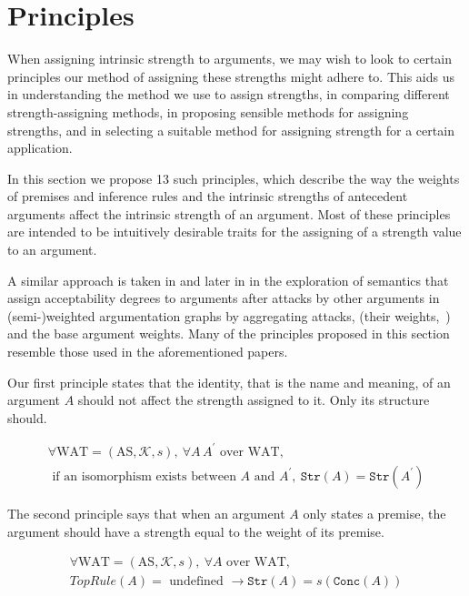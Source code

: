 \documentclass[runningheads]{llncs}
\newcommand{\K}{\mathcal{K}}
\newcommand{\pr}{^\prime}
\newcommand{\Conc}{\texttt{Conc}}
\newcommand{\TopRule}{\texttt{TopRule}}
\newcommand{\Str}{\texttt{Str}}
\begin{document}
\section{Principles}\label{Principles}

When assigning intrinsic strength to arguments, we may wish to look to certain principles our method of assigning these strengths might adhere to. This aids us in understanding the method we use to assign strengths, in comparing different strength-assigning methods, in proposing sensible methods for assigning strengths, and in selecting a suitable method for assigning strength for a certain application.

In this section we propose 13 such principles, which describe the way the weights of premises and inference rules and the intrinsic strengths of antecedent arguments affect the intrinsic strength of an argument. Most of these principles are intended to be intuitively desirable traits for the assigning of a strength value to an argument.

A similar approach is taken in \cite{DBLP:conf/ijcai/AmgoudBDV17} and later in \cite{DBLP:conf/atal/AmgoudD19} in the exploration of semantics that assign acceptability degrees to arguments after attacks by other arguments in (semi-)weighted argumentation graphs by aggregating attacks, (their weights,~) and the base argument weights. Many of the principles proposed in this section resemble those used in the aforementioned papers.

Our first principle states that the identity, that is the name and meaning, of an argument $A$ should not affect the strength assigned to it. Only its structure should.
\begin{principle}[Anonymity]\label{Anonymity}
\begin{multline*}
    \forall \text{WAT} = ( \text{AS}, \K, s ),\ \forall A\, A\pr \text{ over WAT},\\\text{ if an isomorphism exists between } A \text{ and } A\pr,\  \Str(A) = \Str(A\pr)
\end{multline*}
\end{principle}

The second principle says that when an argument $A$ only states a premise, the argument should have a strength equal to the weight of its premise.
\begin{principle}[Premising]
\begin{multline*}
    \forall \text{WAT} = ( \text{AS}, \K, s ),\ \forall A \text{ over WAT},\\TopRule(A) = \text{ undefined } \rightarrow \Str(A) = s(\Conc(A))
\end{multline*}
\end{principle}
\end{document}
